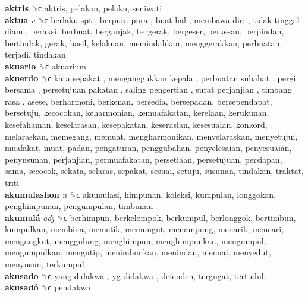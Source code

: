 \textbf{aktris} ␝ϲ  aktris, pelakon, pelaku, seniwati  \\
\textbf{aktua} \emph{v}  ␝ϲ   berlaku spt ,  berpura-pura ,  buat hal ,  membawa diri ,  tidak tinggal diam , beraksi, berbuat, berganjak, bergerak, bergeser, berkesan, berpindah, bertindak, gerak, hasil, kelakuan, memindahkan, menggerakkan, perbuatan, terjadi, tindakan  \\
\textbf{akuario} ␝ϲ  akuarium  \\
\textbf{akuerdo} ␝ϲ   kata sepakat ,  menganggukkan kepala ,  perbuatan subahat ,  pergi bersama ,  persetujuan pakatan ,  saling pengertian ,  surat perjanjian ,  timbang rasa , asese, berharmoni, berkenan, bersedia, bersepadan, bersependapat, bersetuju, kecocokan, keharmonian, kemuafakatan, kerelaan, kerukunan, kesefahaman, keselarasan, kesepakatan, keserasian, kesesuaian, konkord, melaraskan, memegang, memuat, mengharmonikan, menyelaraskan, menyetujui, muafakat, muat, padan, pengaturan, penggubahan, penyelesaian, penyesuaian, penyusunan, perjanjian, permuafakatan, persetiaan, persetujuan, persiapan, sama, secocok, sekata, selaras, sepakat, sesuai, setuju, susunan, tindakan, traktat, triti  \\
\textbf{akumulashon} \emph{n}  ␝ϲ  akumulasi, himpunan, koleksi, kumpulan, longgokan, penghimpunan, pengumpulan, timbunan  \\
\textbf{akumulá} \emph{adj}  ␝ϲ  berhimpun, berkelompok, berkumpul, berlonggok, bertimbun, kumpulkan, membina, memetik, memungut, menampung, menarik, mencari, mengangkut, menggulung, menghimpun, menghimpunkan, mengumpul, mengumpulkan, mengutip, menimbunkan, menindan, menuai, menyedut, menyusun, terkumpul  \\
\textbf{akusado} ␝ϲ   yang didakwa ,  yg didakwa , defenden, tergugat, tertuduh  \\
\textbf{akusadó} ␝ϲ  pendakwa  \\
